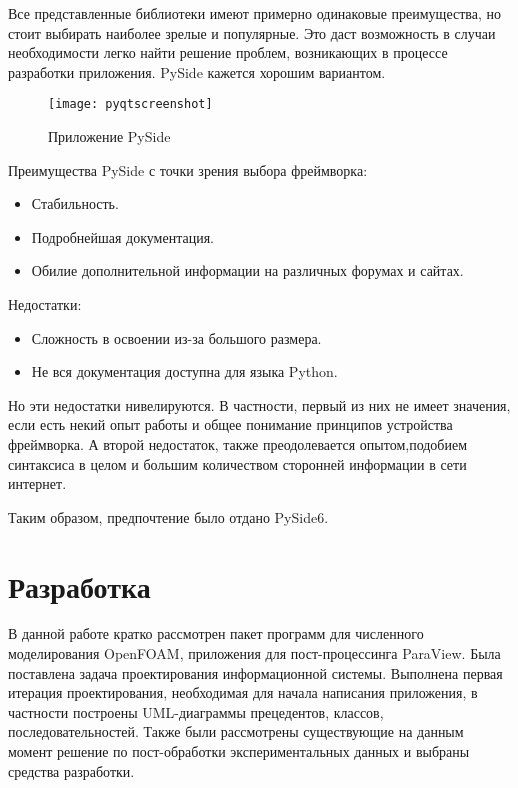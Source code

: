 \documentclass[14pt]{extreport}
\begin{document}
Все представленные библиотеки имеют примерно одинаковые преимущества, но стоит выбирать наиболее зрелые и популярные. Это даст возможность в случаи необходимости легко найти решение проблем, возникающих в процессе разработки приложения. PySide кажется хорошим вариантом.

\begin{figure}[H]
	\centerline{\texttt{[image: pyqtscreenshot]}}
	\caption{Приложение PySide}
	\label{fig14}
\end{figure}

Преимущества PySide с точки зрения выбора фреймворка:
\begin{itemize}
	\item Стабильность.
	\item Подробнейшая документация.
	\item Обилие дополнительной информации на различных форумах и сайтах.
\end{itemize}

Недостатки:
\begin{itemize}
	\item Сложность в освоении из-за большого размера.
	\item Не вся документация доступна для языка Python.
\end{itemize}

Но эти недостатки нивелируются. В частности, первый из них не имеет значения, если есть некий опыт работы и общее понимание принципов устройства фреймворка. А второй недостаток, также преодолевается опытом,подобием синтаксиса в целом и большим количеством сторонней информации в сети интернет.

Таким образом, предпочтение было отдано PySide6. 

\chapter{Разработка}


\conclusions

В данной работе кратко рассмотрен пакет программ для численного моделирования OpenFOAM, приложения для пост-процессинга ParaView. Была поставлена задача проектирования информационной системы. Выполнена первая итерация проектирования, необходимая для начала написания приложения, в частности построены UML-диаграммы прецедентов, классов, последовательностей. Также были рассмотрены существующие на данным момент решение по пост-обработки экспериментальных данных и выбраны средства разработки.
\end{document}
